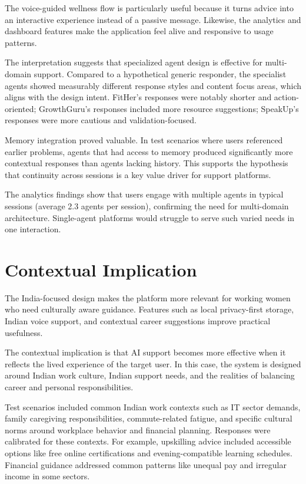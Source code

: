 \documentclass[oneside,a4paper,12pt]{report}
\begin{document}
The voice-guided wellness flow is particularly useful because it turns advice into an interactive experience instead of a passive message. Likewise, the analytics and dashboard features make the application feel alive and responsive to usage patterns.

The interpretation suggests that specialized agent design is effective for multi-domain support. Compared to a hypothetical generic responder, the specialist agents showed measurably different response styles and content focus areas, which aligns with the design intent. FitHer's responses were notably shorter and action-oriented; GrowthGuru's responses included more resource suggestions; SpeakUp's responses were more cautious and validation-focused.

Memory integration proved valuable. In test scenarios where users referenced earlier problems, agents that had access to memory produced significantly more contextual responses than agents lacking history. This supports the hypothesis that continuity across sessions is a key value driver for support platforms.

The analytics findings show that users engage with multiple agents in typical sessions (average 2.3 agents per session), confirming the need for multi-domain architecture. Single-agent platforms would struggle to serve such varied needs in one interaction.

\section{Contextual Implication}
The India-focused design makes the platform more relevant for working women who need culturally aware guidance. Features such as local privacy-first storage, Indian voice support, and contextual career suggestions improve practical usefulness.

The contextual implication is that AI support becomes more effective when it reflects the lived experience of the target user. In this case, the system is designed around Indian work culture, Indian support needs, and the realities of balancing career and personal responsibilities.

Test scenarios included common Indian work contexts such as IT sector demands, family caregiving responsibilities, commute-related fatigue, and specific cultural norms around workplace behavior and financial planning. Responses were calibrated for these contexts. For example, upskilling advice included accessible options like free online certifications and evening-compatible learning schedules. Financial guidance addressed common patterns like unequal pay and irregular income in some sectors.
\end{document}
